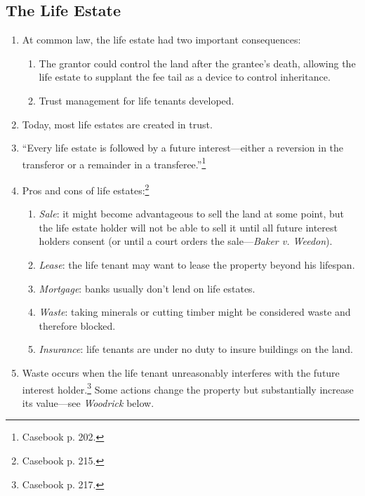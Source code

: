 \subsection{The Life Estate}

\begin{enumerate}
    \item At common law, the life estate had two important consequences:
    \begin{enumerate}
        \item The grantor could control the land after the grantee's death, 
        allowing the life estate to supplant the fee tail as a device to 
        control inheritance.
        \item Trust management for life tenants developed.
    \end{enumerate}
    \item Today, most life estates are created in trust.
    \item ``Every life estate is followed by a future interest---either a 
    reversion in the transferor or a remainder in a 
    transferee.''\footnote{Casebook p. 202.}
    \item Pros and cons of life estates:\footnote{Casebook p. 215.}
    \begin{enumerate}
        \item \emph{Sale}: it might become advantageous to sell the land at 
        some point, but the life estate holder will not be able to sell it 
        until all future interest holders consent (or until a court orders the 
        sale---\emph{Baker v. Weedon}).
        \item \emph{Lease}: the life tenant may want to lease the property 
        beyond his lifespan.
        \item \emph{Mortgage}: banks usually don't lend on life estates.
        \item \emph{Waste}: taking minerals or cutting timber might be 
        considered waste and therefore blocked.
        \item \emph{Insurance}: life tenants are under no duty to insure 
        buildings on the land.
    \end{enumerate}
    \item Waste occurs when the life tenant unreasonably interferes with the 
    future interest holder.\footnote{Casebook p. 217.} Some actions change the 
    property but substantially increase its value---see \emph{Woodrick} below.
\end{enumerate}

